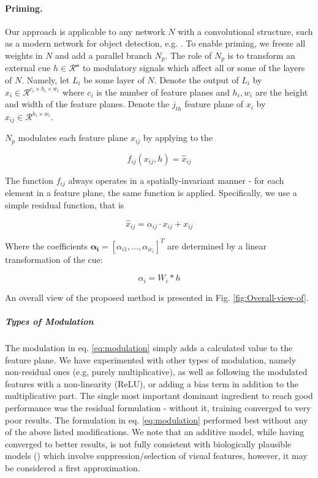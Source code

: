 \documentclass[10pt,letterpaper,twocolumn]{article}
\begin{document}
\paragraph{Priming.}

Our approach is applicable to any network $N$ with a convolutional
structure, such as a modern network for object detection, e.g. \cite{liu2016ssd}.
To enable priming, we freeze all weights in $N$ and add a parallel
branch $N_{p}$. The role of $N_{p}$ is to transform an external
cue $h\in\mathcal{R^{\text{n}}}$ to modulatory signals which affect
all or some of the layers of $N$. Namely, let $L_{i}$ be some layer
of $N.$ Denote the output of $L_{i}$ by $x_{i}\in\mathcal{R}^{c_{i}\times h_{i}\times w_{i}}$
where $c_{i}$ is the number of feature planes and $h_{i},w_{i}$
are the height and width of the feature planes. Denote the $j_{th}$
feature plane of $x_{i}$ by $x_{ij}\in\mathcal{R}^{h_{i}\times w_{i}}$. 

$N_{p}$ modulates each feature plane $x_{ij}$ by applying to the

\begin{equation}
f_{ij}(x_{ij},h)=\hat{x}_{ij}
\end{equation}

The function $f_{ij}$ always operates in a spatially-invariant manner
- for each element in a feature plane, the same function is applied.
Specifically, we use a simple residual function, that is 

\begin{equation}
\hat{x}_{ij}=\alpha_{ij}\cdot x_{ij}+x_{ij}\label{eq:modulation}
\end{equation}

Where the coefficients $\boldsymbol{\alpha_{i}=}[\alpha_{i1},\dots,\alpha_{ic_{i}}]^{T}$
are determined by a linear transformation of the cue:

\begin{equation}
\alpha_{i}=W_{i}*h
\end{equation}

An overall view of the proposed method is presented in Fig. \ref{fig:Overall-view-of}.

\subparagraph{Types of Modulation}

The modulation in eq. \ref{eq:modulation} simply adds a calculated
value to the feature plane. We have experimented with other types
of modulation, namely non-residual ones (e.g, purely multiplicative),
as well as following the modulated features with a non-linearity (ReLU),
or adding a bias term in addition to the multiplicative part. The
single most important dominant ingredient to reach good performance
was the residual formulation - without it, training converged to very
poor results. The formulation in eq. \ref{eq:modulation} performed
best without any of the above listed modifications. We note that an
additive model, while having converged to better results, is not fully
consistent with biologically plausible models (\cite{tsotsos1995SelTun})
which involve suppression/selection of visual features, however, it
may be considered a first approximation.
\end{document}
